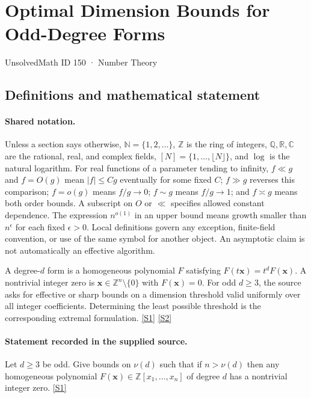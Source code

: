 \documentclass[11pt,a4paper]{article}
\newcommand{\N}{\mathbb{N}}
\newcommand{\Z}{\mathbb{Z}}
\newcommand{\Q}{\mathbb{Q}}
\newcommand{\R}{\mathbb{R}}
\newcommand{\C}{\mathbb{C}}
\newcommand{\sref}[2]{\hyperlink{source:#1:#2}{[S#2]}}
\begin{document}

\setcounter{section}{149}

\section{Optimal Dimension Bounds for Odd-Degree Forms}\label{150}

{\small\sffamily UnsolvedMath ID 150 · Number Theory}

\subsection{Definitions and mathematical statement}

\paragraph{Shared notation.}Unless a section says otherwise, $\N=\{1,2,\ldots\}$,
$\Z$ is the ring of integers, $\Q,\R,\C$ are the rational, real, and complex
fields, $[N]=\{1,\ldots,\lfloor N\rfloor\}$, and $\log$ is the natural
logarithm. For real functions of a parameter tending to infinity,
$f\ll g$ and $f=O(g)$ mean $|f|\leq Cg$ eventually for some fixed $C$;
$f\gg g$ reverses this comparison; $f=o(g)$ means $f/g\to0$;
$f\sim g$ means $f/g\to1$; and $f\asymp g$ means both order bounds.
A subscript on $O$ or $\ll$ specifies allowed constant dependence.
The expression $n^{o(1)}$ in an upper bound means growth smaller than
$n^\epsilon$ for each fixed $\epsilon>0$. Local definitions govern any
exception, finite-field convention, or use of the same symbol for another
object. An asymptotic claim is not automatically an effective algorithm.



A degree-$d$ form is a homogeneous polynomial $F$ satisfying $F(t\mathbf x)=t^dF(\mathbf x)$. A nontrivial integer zero is $\mathbf x\in\Z^n\setminus\{0\}$ with $F(\mathbf x)=0$. For odd $d\geq3$, the source asks for effective or sharp bounds on a dimension threshold valid uniformly over all integer coefficients. Determining the least possible threshold is the corresponding extremal formulation. \sref{150}{1} \sref{150}{2}

\paragraph{Statement recorded in the supplied source.}
Let $d \geq 3$ be odd. Give bounds on $\nu(d)$ such that if $n > \nu(d)$ then any homogeneous polynomial $F(\mathbf{x}) \in \mathbb{Z}[x_1, \dots, x_n]$ of degree $d$ has a nontrivial integer zero. \sref{150}{1}
\end{document}
